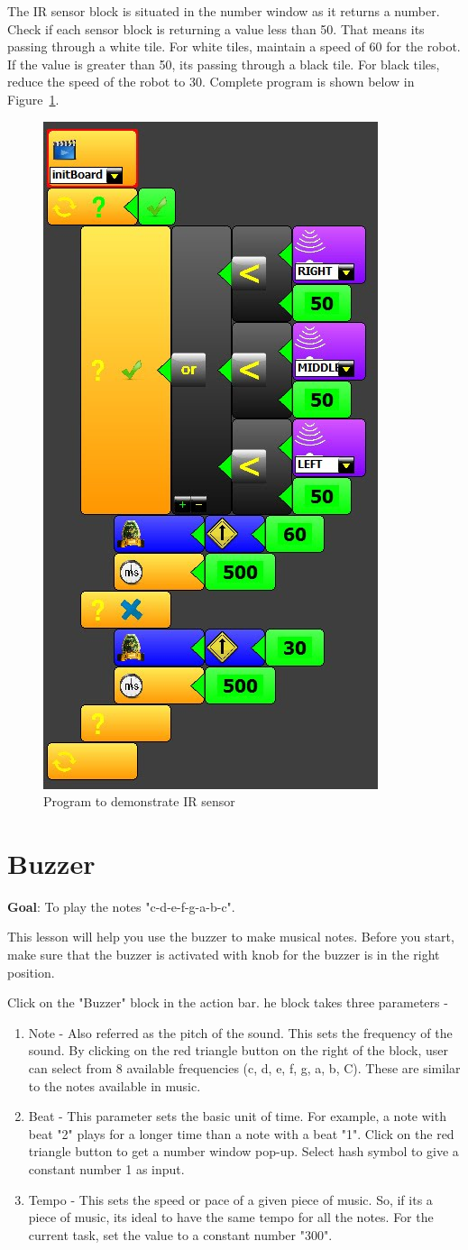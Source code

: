 The IR sensor block is situated in the number window as it returns a number. Check if each sensor block is returning a value less than 50. That means its passing through a white tile. For white tiles, maintain a speed of 60 for the robot. If the value is greater than 50, its passing through a black tile. For black tiles, reduce the speed of the robot to 30.
Complete program is shown below in Figure~\ref{fig:lesson_9}.

\begin{figure}[h]
\centering
\includegraphics[width=0.3\columnwidth]{Images/Manual/lesson_9}
\caption{Program to demonstrate IR sensor}
\label{fig:lesson_9}
\end{figure}

\section{Buzzer}

\textbf{Goal}: To play the notes "c-d-e-f-g-a-b-c".

This lesson will help you use the buzzer to make musical notes. Before you start, make sure that the buzzer is activated with knob for the buzzer is in the right position. 

Click on the "Buzzer" block in the action bar. he block takes three parameters -

\begin{enumerate}
\item Note - Also referred as the pitch of the sound. This sets the frequency of the sound. By clicking on the red triangle button on the right of the block, user can select from 8 available frequencies (c, d, e, f, g, a, b, C). These are similar to the notes available in music.
\item Beat - This parameter sets the basic unit of time. For example, a note with beat "2" plays for a longer time than a note with a beat "1". Click on the red triangle button to get a number window pop-up. Select hash symbol to give a constant number 1 as input. 
\item Tempo - This sets the speed or pace of a given piece of music. So, if its a piece of music, its ideal to have the same tempo for all the notes. For the current task, set the value to a constant number "300". 
\end{enumerate}

